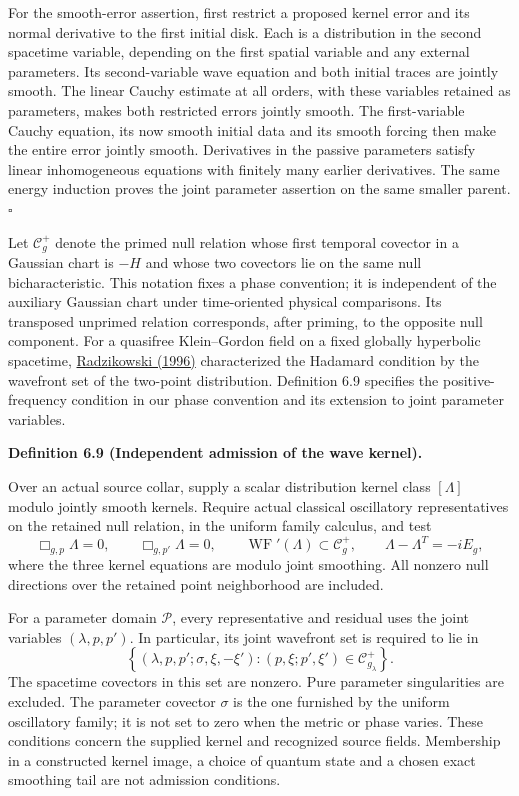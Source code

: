 \documentclass[
  english,
  11pt,
  reqno]{amsart}
\makeatletter
\newcommand{\pandocstatementheading}[1]{%
  \par\if@nobreak\else
    \addpenalty{\@beginparpenalty}%
    \addvspace{.5\baselineskip plus .2\baselineskip minus .2\baselineskip}%
  \fi
  {\normalfont\bfseries #1\par}%
  \nobreak\@afterindenttrue\@afterheading
}
\makeatother
\begin{document}
For the smooth-error assertion, first restrict a proposed kernel error
and its normal derivative to the first initial disk. Each is a
distribution in the second spacetime variable, depending on the first
spatial variable and any external parameters. Its second-variable wave
equation and both initial traces are jointly smooth. The linear Cauchy
estimate at all orders, with these variables retained as parameters,
makes both restricted errors jointly smooth. The first-variable Cauchy
equation, its now smooth initial data and its smooth forcing then make
the entire error jointly smooth. Derivatives in the passive parameters
satisfy linear inhomogeneous equations with finitely many earlier
derivatives. The same energy induction proves the joint parameter
assertion on the same smaller parent. \hfill\(\square\)

Let \(\mathcal C_g^+\) denote the primed null relation whose first
temporal covector in a Gaussian chart is \(-H\) and whose two covectors
lie on the same null bicharacteristic. This notation fixes a phase
convention; it is independent of the auxiliary Gaussian chart under
time-oriented physical comparisons. Its transposed unprimed relation
corresponds, after priming, to the opposite null component. For a
quasifree Klein--Gordon field on a fixed globally hyperbolic spacetime,
\hyperref[ref-Radzikowski1996]{Radzikowski (1996)} characterized the
Hadamard condition by the wavefront set of the two-point distribution.
Definition 6.9 specifies the positive-frequency condition in our phase
convention and its extension to joint parameter variables.

\pandocstatementheading{\leavevmode{}\label{def:online-independent-wave-kernel}Definition 6.9 (Independent admission of the wave kernel).}

Over an actual source collar, supply a scalar distribution kernel class
\([\Lambda]\) modulo jointly smooth kernels. Require actual classical
oscillatory representatives on the retained null relation, in the
uniform family calculus, and test%
\begingroup{}\relax{} \[
\Box_{g,p}\Lambda=0,\qquad
\Box_{g,p'}\Lambda=0,\qquad
\operatorname{WF}'(\Lambda)\subset\mathcal C_g^+,
\qquad
\Lambda-\Lambda^T=-iE_g,
\]\endgroup where the three kernel equations are modulo joint smoothing. All
nonzero null directions over the retained point neighborhood are
included.

For a parameter domain \(\mathcal P\), every representative and residual
uses the joint variables \((\lambda,p,p')\). In particular, its joint
wavefront set is required to lie in%
 \[
\left\{
(\lambda,p,p';\sigma,\xi,-\xi'):
(p,\xi;p',\xi')\in\mathcal C_{g_\lambda}^+
\right\}.
\] The spacetime covectors in this set are nonzero. Pure parameter
singularities are excluded. The parameter covector \(\sigma\) is the one
furnished by the uniform oscillatory family; it is not set to zero when
the metric or phase varies. These conditions concern the supplied kernel
and recognized source fields. Membership in a constructed kernel image,
a choice of quantum state and a chosen exact smoothing tail are not
admission conditions.
\end{document}
